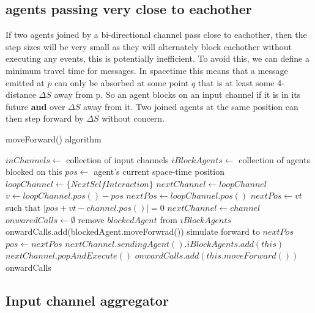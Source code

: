 \documentclass[a4paper]{article}
\begin{document}
\subsection{agents passing very close to eachother}

If two agents joined by a bi-directional channel pass close to eachother, then the step sizes will be very small as they will alternately block eachother without executing any events, this is potentially inefficient. To avoid this, we can define a minimum travel time for messages. In spacetime this means that a message emitted at $p$ can only be absorbed at some point $q$ that is at least some 4-distance $\Delta S$ away from p. So an agent blocks on an input channel if it is in its future \textbf{and} over $\Delta S$ away from it. Two joined agents at the same position can then step forward by $\Delta S$ without concern.

\begin{algorithm}
	\caption{moveForward() algorithm}
\begin{algorithmic}
	\STATE $inChannels \gets $ collection of input channels
	\STATE $iBlockAgents \gets $ collection of agents blocked on this
	\STATE $pos \gets $ agent's current space-time position
	\STATE $loopChannel \gets \{NextSelfInteraction\}$
	\STATE $nextChannel \gets loopChannel$
	\STATE $v \gets loopChannel.pos() - pos$ 
	\STATE $nextPos \gets loopChannel.pos()$ 
			\STATE $nextPos \gets vt$ such that $|pos + vt - channel.pos()| = 0$ 
			\STATE $nextChannel \gets channel$ 
		\ENDIF
	\ENDFOR
	\STATE $onwaredCalls \gets \emptyset$
			\STATE remove $blockedAgent$ from $iBlockAgents$
			\STATE onwardCalls.add(blockedAgent.moveForwrad())
		\ENDIF
	\ENDFOR
	\STATE simulate forward to $nextPos$
	\STATE $pos \gets nextPos$
		\STATE $nextChannel.sendingAgent().iBlockAgents.add(this)$
	\ELSE
		\STATE $nextChannel.popAndExecute()$
		\STATE $onwardCalls.add(this.moveForward())$
	\ENDIF
	\RETURN onwardCalls
\end{algorithmic}
\end{algorithm}

\subsection{Input channel aggregator}
\end{document}
